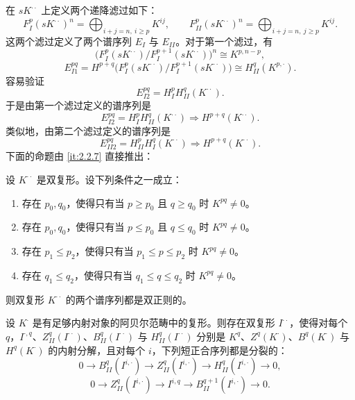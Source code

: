 在 $sK^{\cdot\cdot}$ 上定义两个递降滤过如下：
\[
F_I^p(sK^{\cdot\cdot})^n=\bigoplus_{i+j=n,\ i\ge p}K^{ij},\qquad F_{II}^p(sK^{\cdot\cdot})^n=\bigoplus_{i+j=n,\ j\ge p}K^{ij}.
\]
这两个滤过定义了两个谱序列 $E_I$ 与 $E_{II}$。对于第一个滤过，有
\[
\bigl(F_I^p(sK^{\cdot\cdot})/F_I^{p+1}(sK^{\cdot\cdot})\bigr)^n\cong K^{p,n-p},
\]
\[
E_{I1}^{pq}=H^{p+q}\bigl(F_I^p(sK^{\cdot\cdot})/F_I^{p+1}(sK^{\cdot\cdot})\bigr)\cong H_{II}^q(K^{p,\cdot}).
\]
容易验证
\[
E_{I2}^{pq}=H_I^pH_{II}^q(K^{\cdot\cdot}).
\]
于是由第一个滤过定义的谱序列是
\[
E_{I2}^{pq}=H_I^pH_{II}^q(K^{\cdot\cdot})\Rightarrow H^{p+q}(K^{\cdot\cdot}).
\]
类似地，由第二个滤过定义的谱序列是
\[
E_{II2}^{pq}=H_{II}^pH_I^q(K^{\cdot\cdot})\Rightarrow H^{p+q}(K^{\cdot\cdot}).
\]
下面的命题由 \ref{it:2.2.7} 直接推出：

\begin{proposition}\label{it:2.2.8}
设 $K^{\cdot\cdot}$ 是双复形。设下列条件之一成立：
\begin{enumerate}[label=(\roman*),leftmargin=2.8em]
  \item 存在 $p_0,q_0$，使得只有当 $p\ge p_0$ 且 $q\ge q_0$ 时 $K^{pq}\ne 0$。
  \item 存在 $p_0,q_0$，使得只有当 $p\le p_0$ 且 $q\le q_0$ 时 $K^{pq}\ne 0$。
  \item 存在 $p_1\le p_2$，使得只有当 $p_1\le p\le p_2$ 时 $K^{pq}\ne 0$。
  \item 存在 $q_1\le q_2$，使得只有当 $q_1\le q\le q_2$ 时 $K^{pq}\ne 0$。
\end{enumerate}
则双复形 $K^{\cdot\cdot}$ 的两个谱序列都是双正则的。
\end{proposition}

\begin{proposition}\label{it:2.2.9}
设 $K^{\cdot}$ 是有足够内射对象的阿贝尔范畴中的复形。则存在双复形 $I^{\cdot\cdot}$，使得对每个 $q$，$I^{\cdot,q}$、$Z_{II}^q(I^{\cdot\cdot})$、$B_{II}^q(I^{\cdot\cdot})$ 与 $H_{II}^q(I^{\cdot\cdot})$ 分别是 $K^q$、$Z^q(K^{\cdot})$、$B^q(K^{\cdot})$ 与 $H^q(K^{\cdot})$ 的内射分解，且对每个 $i$，下列短正合序列都是分裂的：
\[
0\to B_{II}^q(I^{i,\cdot})\to Z_{II}^q(I^{i,\cdot})\to H_{II}^q(I^{i,\cdot})\to 0,
\]
\[
0\to Z_{II}^q(I^{i,\cdot})\to I^{i,q}\to B_{II}^{q+1}(I^{i,\cdot})\to 0.
\]
\end{proposition}

